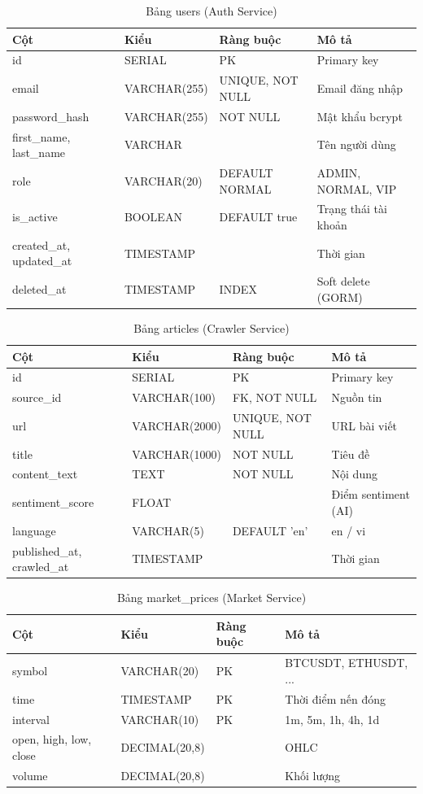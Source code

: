 \begin{table}[H]
\centering
\caption{Bảng users (Auth Service)}
\begin{tabular}{|l|l|l|l|}
\hline
\textbf{Cột} & \textbf{Kiểu} & \textbf{Ràng buộc} & \textbf{Mô tả} \\
\hline
id & SERIAL & PK & Primary key \\
email & VARCHAR(255) & UNIQUE, NOT NULL & Email đăng nhập \\
password\_hash & VARCHAR(255) & NOT NULL & Mật khẩu bcrypt \\
first\_name, last\_name & VARCHAR & & Tên người dùng \\
role & VARCHAR(20) & DEFAULT NORMAL & ADMIN, NORMAL, VIP \\
is\_active & BOOLEAN & DEFAULT true & Trạng thái tài khoản \\
created\_at, updated\_at & TIMESTAMP & & Thời gian \\
deleted\_at & TIMESTAMP & INDEX & Soft delete (GORM) \\
\hline
\end{tabular}
\end{table}

\begin{table}[H]
\centering
\caption{Bảng articles (Crawler Service)}
\begin{tabular}{|l|l|l|l|}
\hline
\textbf{Cột} & \textbf{Kiểu} & \textbf{Ràng buộc} & \textbf{Mô tả} \\
\hline
id & SERIAL & PK & Primary key \\
source\_id & VARCHAR(100) & FK, NOT NULL & Nguồn tin \\
url & VARCHAR(2000) & UNIQUE, NOT NULL & URL bài viết \\
title & VARCHAR(1000) & NOT NULL & Tiêu đề \\
content\_text & TEXT & NOT NULL & Nội dung \\
sentiment\_score & FLOAT & & Điểm sentiment (AI) \\
language & VARCHAR(5) & DEFAULT 'en' & en / vi \\
published\_at, crawled\_at & TIMESTAMP & & Thời gian \\
\hline
\end{tabular}
\end{table}

\begin{table}[H]
\centering
\caption{Bảng market\_prices (Market Service)}
\begin{tabular}{|l|l|l|l|}
\hline
\textbf{Cột} & \textbf{Kiểu} & \textbf{Ràng buộc} & \textbf{Mô tả} \\
\hline
symbol & VARCHAR(20) & PK & BTCUSDT, ETHUSDT, ... \\
time & TIMESTAMP & PK & Thời điểm nến đóng \\
interval & VARCHAR(10) & PK & 1m, 5m, 1h, 4h, 1d \\
open, high, low, close & DECIMAL(20,8) & & OHLC \\
volume & DECIMAL(20,8) & & Khối lượng \\
\hline
\end{tabular}
\end{table}

